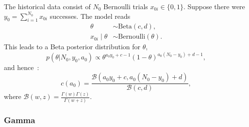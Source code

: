 \documentclass[a4paper, notitlepage, 11pt]{article}
\begin{document}
The historical data consist of $N_0$ Bernoulli trials $x_{0i} \in \{0,1\}$.
Suppose there were $y_0 = \sum_{i=1}^{N_0}x_{0i}$ successes.
The model reads
\begin{align*}
 \theta &\sim \text{Beta}(c, d), \\
 x_{0i} \mid \theta &\sim \text{Bernoulli}(\theta).
\end{align*}
This leads to a Beta posterior distribution for $\theta$,
\begin{equation}
 \label{eq:bernoulli_posterior}
 p(\theta | N_0, y_0, a_0) \propto \theta ^{a_0 y_0 + c - 1} (1-\theta)^{a_0 (N_0 -y_0) + d - 1},
\end{equation}
and hence~\citep{Neuenschwander2009}:
\begin{equation}
 \label{eq:cA0_bernoulli}
 c(a_0) = \frac{\mathcal{B}(a_0 y_0 + c, a_0 (N_0 -y_0) + d)}{\mathcal{B}(c, d)},
\end{equation}
where $\mathcal{B}(w, z) = \frac{\Gamma(w)\Gamma(z)}{\Gamma(w + z)}$.


\subsubsection{Gamma}
\label{sec:gamma_ex}
\end{document}
